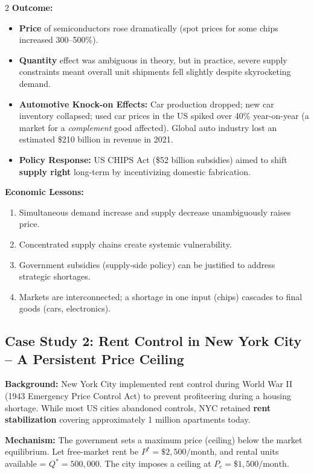 \documentclass[10pt,a4paper]{article}
\begin{document}
\begin{multicols}{2}
\textbf{Outcome:}
\begin{itemize}[leftmargin=*,nosep]
    \item \textbf{Price} of semiconductors rose dramatically (spot prices for some chips increased 300--500\%).
    \item \textbf{Quantity} effect was ambiguous in theory, but in practice, severe supply constraints meant overall unit shipments fell slightly despite skyrocketing demand.
    \item \textbf{Automotive Knock-on Effects:} Car production dropped; new car inventory collapsed; used car prices in the US spiked over 40\% year-on-year (a market for a \textit{complement} good affected). Global auto industry lost an estimated \$210 billion in revenue in 2021.
    \item \textbf{Policy Response:} US CHIPS Act (\$52 billion subsidies) aimed to shift \textbf{supply right} long-term by incentivizing domestic fabrication.
\end{itemize}

\textbf{Economic Lessons:}
\begin{enumerate}[leftmargin=*,nosep]
    \item Simultaneous demand increase and supply decrease unambiguously raises price.
    \item Concentrated supply chains create systemic vulnerability.
    \item Government subsidies (supply-side policy) can be justified to address strategic shortages.
    \item Markets are interconnected; a shortage in one input (chips) cascades to final goods (cars, electronics).
\end{enumerate}

\subsection*{Case Study 2: Rent Control in New York City -- A Persistent Price Ceiling}

\textbf{Background:} New York City implemented rent control during World War II (1943 Emergency Price Control Act) to prevent profiteering during a housing shortage. While most US cities abandoned controls, NYC retained \textbf{rent stabilization} covering approximately 1 million apartments today.

\textbf{Mechanism:} The government sets a maximum price (ceiling) below the market equilibrium. Let free-market rent be $P^* = \$2,500/\text{month}$, and rental units available = $Q^* = 500,000$. The city imposes a ceiling at $P_c = \$1,500/\text{month}$.


\end{multicols}
\end{document}
